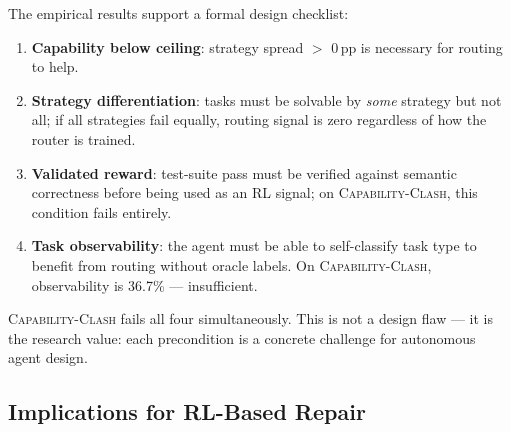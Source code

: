 \documentclass[sigconf,review,anonymous]{acmart}
\newcommand{\ccbench}{\textsc{Capability-Clash}}
\newcommand{\pp}{\,pp}
\begin{document}
The empirical results support a formal design checklist:
\begin{enumerate}[leftmargin=*,itemsep=1pt]
  \item \textbf{Capability below ceiling}: strategy spread $>$ 0\pp{} is necessary for routing to help.
  \item \textbf{Strategy differentiation}: tasks must be solvable by \emph{some} strategy but not all; if all strategies fail equally, routing signal is zero regardless of how the router is trained.
  \item \textbf{Validated reward}: test-suite pass must be verified against semantic correctness before being used as an RL signal; on \ccbench{}, this condition fails entirely.
  \item \textbf{Task observability}: the agent must be able to self-classify task type to benefit from routing without oracle labels. On \ccbench{}, observability is 36.7\% — insufficient.
\end{enumerate}
\ccbench{} fails all four simultaneously. This is not a design flaw — it is the research value: each precondition is a concrete challenge for autonomous agent design.

\subsection{Implications for RL-Based Repair}

\vspace{2pt}
\noindent{}
\vspace{4pt}
\end{document}
